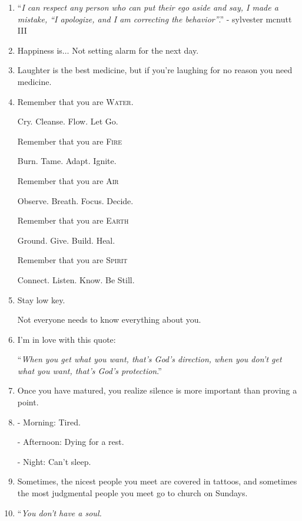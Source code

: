 \documentclass{article}
\numberwithin{equation}{section}
\begin{document}
\begin{enumerate}
    So if things are going good, enjoy it because it won't last forever.
    
    And if things are going bad, don't worry.
    
    It can't last forever either.
    \item ``\textit{I can respect any person who can put their ego aside and say, I made a mistake, ``I apologize, and I am correcting the behavior''}.'' - sylvester mcnutt III
    \item Happiness is$\ldots$ Not setting alarm for the next day.
    \item Laughter is the best medicine, but if you're laughing for no reason you need medicine.
    \item Remember that you are \textsc{Water}.
    
    Cry. Cleanse. Flow. Let Go.
    
    Remember that you are \textsc{Fire}
    
    Burn. Tame. Adapt. Ignite.
    
    Remember that you are \textsc{Air}
    
    Observe. Breath. Focus. Decide.
    
    Remember that you are \textsc{Earth}
    
    Ground. Give. Build. Heal.
    
    Remember that you are \textsc{Spirit}
    
    Connect. Listen. Know. Be Still.
    \item Stay low key.
    
    Not everyone needs to know everything about you.
    \item I'm in love with this quote:
    
    ``\textit{When you get what you want, that's God's direction, when you don't get what you want, that's God's protection}.''
    \item Once you have matured, you realize silence is more important than proving a point.
    \item - Morning: Tired.
    
    - Afternoon: Dying for a rest.
    
    - Night: Can't sleep.
    \item Sometimes, the nicest people you meet are covered in tattoos, and sometimes the most judgmental people you meet go to church on Sundays.
    \item ``\textit{You don't have a soul.}
    

\end{enumerate}
\end{document}

